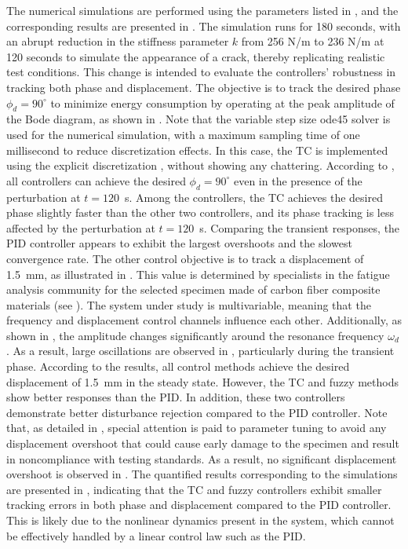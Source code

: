 \documentclass[lettersize,journal]{IEEEtran}
\begin{document}
The numerical simulations are performed using the parameters listed in , and the corresponding results are presented in . The simulation runs for 180 seconds, with an abrupt reduction in the stiffness parameter $k$ from 256 N/m to 236 N/m at 120 seconds to simulate the appearance of a crack, thereby replicating realistic test conditions. This change is intended to evaluate the controllers' robustness in tracking both phase and displacement. The objective is to track the desired phase $\phi_d = 90^\circ$ to minimize energy consumption by operating at the peak amplitude of the Bode diagram, as shown in . Note that the variable step size {\selectfont ode45} solver is used for the numerical simulation, with a maximum sampling time of one millisecond to reduce discretization effects. In this case, the TC is implemented using the explicit discretization , without showing any chattering.
According to , all controllers can achieve the desired $\phi_d = 90^\circ$ even in the presence of the perturbation at $t = 120$~s. Among the controllers, the TC achieves the desired phase slightly faster than the other two controllers, and its phase tracking is less affected by the perturbation at $t = 120$~s. Comparing the transient responses, the PID controller appears to exhibit the largest overshoots and the slowest convergence rate.
The other control objective is to track a displacement of 1.5~mm, as illustrated in . This value is determined by specialists in the fatigue analysis community for the selected specimen made of carbon fiber composite materials (see ). The system under study is multivariable, meaning that the frequency and displacement control channels influence each other. Additionally, as shown in , the amplitude changes significantly around the resonance frequency $\omega_d$. As a result, large oscillations are observed in , particularly during the transient phase. According to the results, all control methods achieve the desired displacement of 1.5~mm in the steady state. However, the TC and fuzzy methods show better responses than the PID. In addition, these two controllers demonstrate better disturbance rejection compared to the PID controller. Note that, as detailed in , special attention is paid to parameter tuning to avoid any displacement overshoot that could cause early damage to the specimen and result in noncompliance with testing standards. As a result, no significant displacement overshoot is observed in . The quantified results corresponding to the simulations are presented in , indicating that the TC and fuzzy controllers exhibit smaller tracking errors in both phase and displacement compared to the PID controller. This is likely due to the nonlinear dynamics present in the system, which cannot be effectively handled by a linear control law such as the PID.
\end{document}
